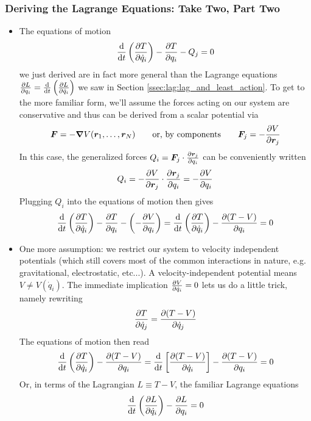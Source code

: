 \documentclass[11pt, a4paper]{article}
\newcommand{\eqtext}[1]{\qquad \text{#1} \qquad}
\begin{document}
\subsubsection{Deriving the Lagrange Equations: Take Two, Part Two}
\begin{itemize}
	\item The equations of motion 
	\begin{equation*}
		\dv{}{t} \left(\pdv{T}{\dot{q}_{i}}\right) - \pdv{T}{q_{i}} - Q_{j} = 0
	\end{equation*}
	we just derived are in fact more general than the Lagrange equations $ \pdv{L}{q_{i}} = \dv{}{t}\left(\pdv{L}{\dot{q}_{i}}\right) $ we saw in Section \ref{ssec:lag:lag_and_least_action}. To get to the more familiar form, we'll assume the forces acting on our system are conservative and thus can be derived from a scalar potential via 
	\begin{equation*}
		\bm{F} = - \grad{V}(\bm{r}_{1}, \ldots, \bm{r}_{N}) \eqtext{or, by components} \bm{F}_{j} = - \pdv{V}{\bm{r}_{j}}
	\end{equation*}
	In this case, the generalized forces $ Q_{i} = \bm{F}_{j} \cdot \pdv{\bm{r}_{j}}{q_{i}} $ can be conveniently written
	\begin{equation*}
		Q_{i} = - \pdv{V}{\bm{r}_{j}} \cdot \pdv{\bm{r}_{j}}{q_{i}} = - \pdv{V}{q_{i}}
	\end{equation*}
	Plugging $ Q_{i} $ into the equations of motion then gives
	\begin{equation*}
		\dv{}{t} \left(\pdv{T}{\dot{q}_{i}}\right) - \pdv{T}{q_{i}} - \left(- \pdv{V}{q_{i}} \right) = \dv{}{t} \left(\pdv{T}{\dot{q}_{i}}\right) - \pdv{(T - V)}{q_{i}} = 0
	\end{equation*}
	
	\item One more assumption: we restrict our system to velocity independent potentials (which still covers most of the common interactions in nature, e.g. gravitational, electrostatic, etc...). A velocity-independent potential means $ V \neq V(\dot{q}_{i})$. The immediate implication $ \pdv{V}{\dot{q}_{i}} = 0 $ lets us do a little trick, namely rewriting
	\begin{equation*}
		\pdv{T}{\dot{q}_{j}} = \pdv{(T - V)}{\dot{q}_{j}}
	\end{equation*}
	The equations of motion then read
	\begin{equation*}
		\dv{}{t} \left(\pdv{T}{\dot{q}_{i}}\right) - \pdv{(T - V)}{q_{i}} = \dv{}{t} \left[\pdv{(T - V)}{\dot{q}_{i}}\right] - \pdv{(T - V)}{q_{i}} = 0
	\end{equation*}
	Or, in terms of the Lagrangian $ L \equiv T - V $, the familiar Lagrange equations
	\begin{equation*}
		\dv{}{t} \left(\pdv{L}{\dot{q}_{i}}\right) - \pdv{L}{q_{i}} = 0
	\end{equation*}
	
\end{itemize}
\end{document}

